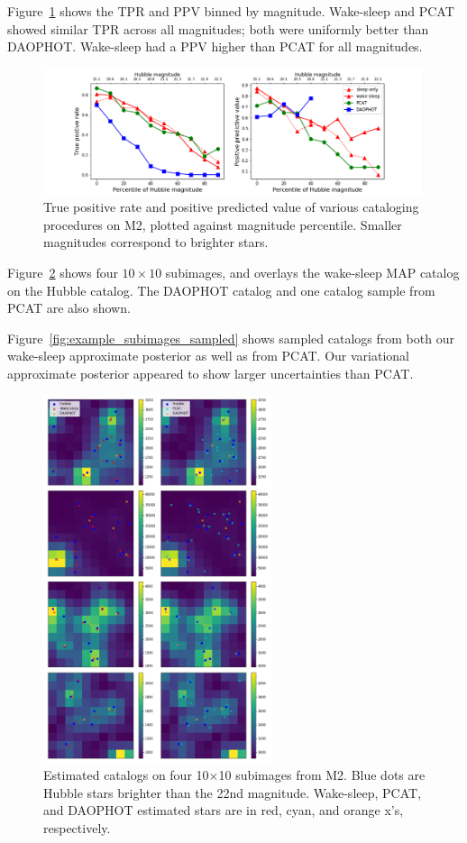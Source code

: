 Figure~\ref{fig:summary_stats} shows the TPR and PPV binned by magnitude.
Wake-sleep and PCAT showed similar TPR across all magnitudes; both were
uniformly better than DAOPHOT. Wake-sleep had a PPV higher than PCAT for all magnitudes. 
\begin{figure}[ht]
    \centering
    \includegraphics[width=0.99\textwidth]{figures/summary_statistics_m2.png}
    \caption{True positive rate and positive predicted value of various cataloging
    procedures on M2, plotted against magnitude percentile.
    Smaller magnitudes correspond to brighter stars. }
    \label{fig:summary_stats}
\end{figure}


Figure~\ref{fig:example_subimages} shows four $10\times10$ subimages, and overlays the wake-sleep MAP catalog on the Hubble catalog. The DAOPHOT catalog and one catalog sample from PCAT are also shown. 

Figure~\ref{fig:example_subimages_sampled} shows sampled catalogs from both our wake-sleep approximate posterior as well as from PCAT.
Our variational approximate posterior appeared to show larger uncertainties
than PCAT. 
\newpage

\begin{figure}[H]
    \centering
    \includegraphics[width=0.6\textwidth]{figures/example_subimages.png}
    \caption{Estimated catalogs on four 10$\times$10 subimages from
    M2. Blue dots are Hubble stars brighter than the 22nd magnitude.
    Wake-sleep, PCAT, and DAOPHOT estimated stars are in
    red, cyan, and orange x's, respectively. }
    \label{fig:example_subimages}
\end{figure}
\newpage

